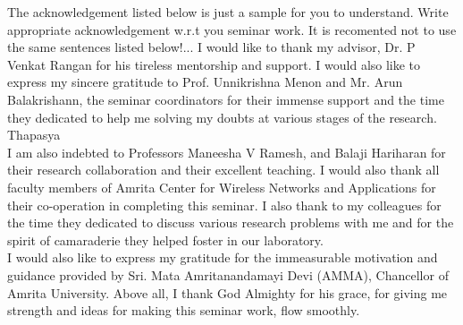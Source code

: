 

\begin{acknowledgements}      %

The acknowledgement listed below is just a sample for you to understand. Write appropriate acknowledgement w.r.t you seminar work. It is recomented not to use the same sentences listed below!...
I would like to thank my advisor, Dr. P Venkat Rangan for his tireless mentorship and support. I would also like to express my sincere gratitude to Prof. Unnikrishna Menon and Mr. Arun Balakrishann, the seminar coordinators  for their immense support and the time they dedicated to help me solving my doubts at various stages of the research.\\[1ex]
Thapasya\\
I am also indebted to Professors Maneesha V Ramesh,  and Balaji Hariharan for their research collaboration and their excellent teaching. I would also thank all faculty members of Amrita Center for Wireless Networks and Applications for their co-operation in completing this seminar. I also thank to my colleagues for the time they dedicated to discuss various research problems with me and for the spirit of camaraderie they helped foster in our laboratory.\\[1ex]

I would also like to express my gratitude for the immeasurable motivation and guidance provided by Sri. Mata Amritanandamayi Devi (AMMA), Chancellor of Amrita University. Above all, I thank God Almighty for his grace, for giving me strength and ideas for making this seminar work, flow smoothly.\\[1ex]

\end{acknowledgements}


